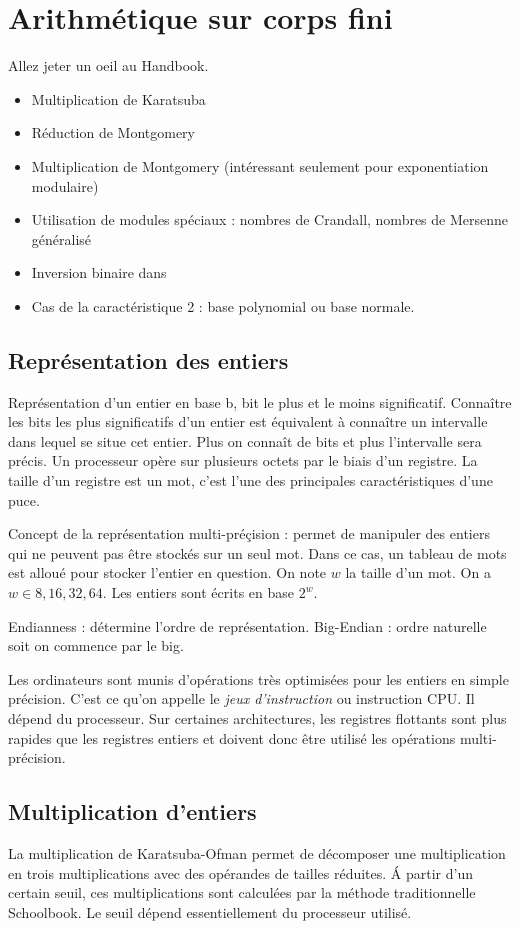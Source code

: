 \chapter{Arithmétique sur corps fini}
Allez jeter un oeil au Handbook.
\begin{itemize}[label=--]
    \item Multiplication de Karatsuba
    \item Réduction de Montgomery
    \item Multiplication de Montgomery (intéressant seulement pour exponentiation modulaire)
    \item Utilisation de modules spéciaux : nombres de Crandall, nombres de Mersenne généralisé
    \item Inversion binaire dans 
    \item Cas de la caractéristique 2 : base polynomial ou base normale.
\end{itemize}

\section{Représentation des entiers}
Représentation d'un entier en base b, bit le plus et le moins significatif. Connaître les bits les plus significatifs d'un entier est équivalent à connaître un intervalle dans lequel se situe cet entier. Plus on connaît de bits et plus l'intervalle sera précis. Un processeur opère sur plusieurs octets par le biais d'un registre. La taille d'un registre est un mot, c'est l'une des principales caractéristiques d'une puce.

Concept de la représentation multi-préçision : permet de manipuler des entiers qui ne peuvent pas être stockés sur un seul mot. Dans ce cas, un tableau de mots est alloué pour stocker l'entier en question. On note $w$ la taille d'un mot. On a $w \in {8, 16, 32, 64}$. Les entiers sont écrits en base $2^w$.

Endianness : détermine l'ordre de représentation. Big-Endian : ordre naturelle soit on commence par le big.

Les ordinateurs sont munis d'opérations très optimisées pour les entiers en simple précision. C'est ce qu'on appelle le \emph{jeux d'instruction} ou instruction CPU. Il dépend du processeur. Sur certaines architectures, les registres flottants sont plus rapides que les registres entiers et doivent donc être utilisé les opérations multi-précision. 

\section{Multiplication d'entiers}
La multiplication de Karatsuba-Ofman permet de décomposer une multiplication en trois multiplications avec des opérandes de tailles réduites. \'A partir d'un certain seuil, ces multiplications sont calculées par la méthode traditionnelle Schoolbook. Le seuil dépend essentiellement du processeur utilisé.

